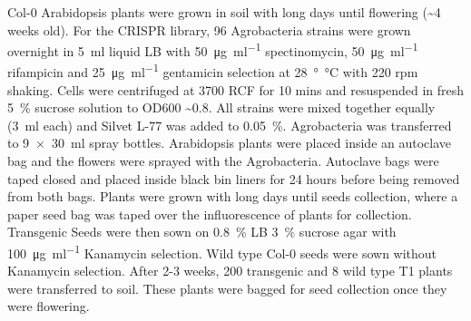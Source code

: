 \documentclass[../main.tex]{subfiles}
\begin{document}
Col-0 Arabidopsis plants were grown in soil with long days until flowering (\textasciitilde{}4 weeks old).
For the CRISPR library, 96 Agrobacteria strains were grown overnight in \SI{5}{\ml} liquid LB with \SI{50}{\micro\gram\per\ml} spectinomycin, \SI{50}{\micro\gram\per\ml} rifampicin and \SI{25}{\micro\gram\per\ml} gentamicin selection at \SI{28}{\degree\celsius} with 220 rpm shaking.
Cells were centrifuged at 3700 RCF for 10 mins and resuspended in fresh \SI{5}{\percent} sucrose solution to OD600 \textasciitilde{}0.8.
All strains were mixed together equally (\SI{3}{\ml} each) and Silvet L-77 was added to \SI{0.05}{\percent}.
Agrobacteria was transferred to \SI{9x30}{\ml} spray bottles.
Arabidopsis plants were placed inside an autoclave bag and the flowers were sprayed with the Agrobacteria.
Autoclave bags were taped closed and placed inside black bin liners for 24 hours before being removed from both bags.
Plants were grown with long days until seeds collection, where a paper seed bag was taped over the influorescence of plants for collection.
Transgenic Seeds were then sown on \SI{0.8}{\percent} LB \SI{3}{\percent} sucrose agar with \SI{100}{\micro\gram\per\ml} Kanamycin selection.
Wild type Col-0 seeds were sown without Kanamycin selection.
After 2-3 weeks, 200 transgenic and 8 wild type T1 plants were transferred to soil.
These plants were bagged for seed collection once they were flowering.
\end{document}
